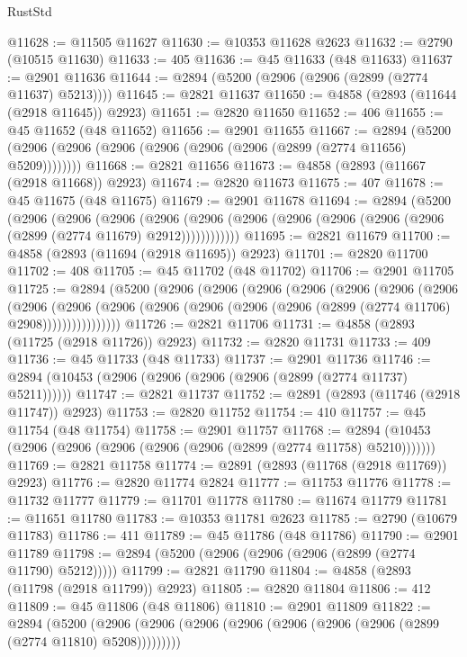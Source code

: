 \begin{lexlean}{RustStd}
\begin{coremodule}
@11628 := @11505 @11627
@11630 := @10353 @11628 @2623
@11632 := @2790 (@10515 @11630)
@11633 := 405
@11636 := @45 @11633 (@48 @11633)
@11637 := @2901 @11636
@11644 := @2894 (@5200 (@2906 (@2906 (@2899 (@2774 @11637) @5213))))
@11645 := @2821 @11637
@11650 := @4858 (@2893 (@11644 (@2918 @11645)) @2923)
@11651 := @2820 @11650
@11652 := 406
@11655 := @45 @11652 (@48 @11652)
@11656 := @2901 @11655
@11667 := @2894 (@5200 (@2906 (@2906 (@2906 (@2906 (@2906 (@2906 (@2899 (@2774 @11656) @5209))))))))
@11668 := @2821 @11656
@11673 := @4858 (@2893 (@11667 (@2918 @11668)) @2923)
@11674 := @2820 @11673
@11675 := 407
@11678 := @45 @11675 (@48 @11675)
@11679 := @2901 @11678
@11694 := @2894
    (@5200
      (@2906
        (@2906
          (@2906
            (@2906 (@2906 (@2906 (@2906 (@2906 (@2906 (@2906 (@2899 (@2774 @11679) @2912))))))))))))
@11695 := @2821 @11679
@11700 := @4858 (@2893 (@11694 (@2918 @11695)) @2923)
@11701 := @2820 @11700
@11702 := 408
@11705 := @45 @11702 (@48 @11702)
@11706 := @2901 @11705
@11725 := @2894
    (@5200
      (@2906
        (@2906
          (@2906
            (@2906
              (@2906
                (@2906
                  (@2906
                    (@2906
                      (@2906
                        (@2906
                          (@2906 (@2906 (@2906 (@2906 (@2899 (@2774 @11706) @2908))))))))))))))))
@11726 := @2821 @11706
@11731 := @4858 (@2893 (@11725 (@2918 @11726)) @2923)
@11732 := @2820 @11731
@11733 := 409
@11736 := @45 @11733 (@48 @11733)
@11737 := @2901 @11736
@11746 := @2894 (@10453 (@2906 (@2906 (@2906 (@2906 (@2899 (@2774 @11737) @5211))))))
@11747 := @2821 @11737
@11752 := @2891 (@2893 (@11746 (@2918 @11747)) @2923)
@11753 := @2820 @11752
@11754 := 410
@11757 := @45 @11754 (@48 @11754)
@11758 := @2901 @11757
@11768 := @2894 (@10453 (@2906 (@2906 (@2906 (@2906 (@2906 (@2899 (@2774 @11758) @5210)))))))
@11769 := @2821 @11758
@11774 := @2891 (@2893 (@11768 (@2918 @11769)) @2923)
@11776 := @2820 @11774 @2824
@11777 := @11753 @11776
@11778 := @11732 @11777
@11779 := @11701 @11778
@11780 := @11674 @11779
@11781 := @11651 @11780
@11783 := @10353 @11781 @2623
@11785 := @2790 (@10679 @11783)
@11786 := 411
@11789 := @45 @11786 (@48 @11786)
@11790 := @2901 @11789
@11798 := @2894 (@5200 (@2906 (@2906 (@2906 (@2899 (@2774 @11790) @5212)))))
@11799 := @2821 @11790
@11804 := @4858 (@2893 (@11798 (@2918 @11799)) @2923)
@11805 := @2820 @11804
@11806 := 412
@11809 := @45 @11806 (@48 @11806)
@11810 := @2901 @11809
@11822 := @2894
    (@5200 (@2906 (@2906 (@2906 (@2906 (@2906 (@2906 (@2906 (@2899 (@2774 @11810) @5208)))))))))

\end{coremodule}
\end{lexlean}
